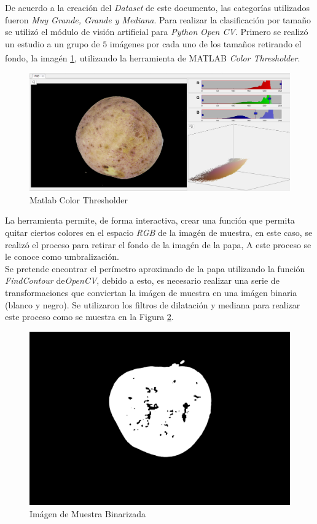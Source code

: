 	De acuerdo a la creación del \textit{Dataset} de este documento, las categorías utilizados fueron \textit{Muy Grande, Grande y Mediana}. Para realizar la clasificación por tamaño se utilizó el módulo de visión artificial para \textit{Python} \textit{Open CV}. Primero se realizó un estudio a un grupo de $5$ imágenes por cada uno de los tamaños retirando el fondo, la imagén \ref{fig:matlabcv}, utilizando la herramienta de MATLAB\textsuperscript{\textregistered} \textit{Color Thresholder}.
	
				
	\begin{figure}[ht]
		\centering
		\includegraphics[scale=0.3]{Figs/matlabcv.png}
		\caption{Matlab Color Thresholder}
		\label{fig:matlabcv}
	\end{figure}
	
	La herramienta permite, de forma interactiva, crear una función que permita quitar ciertos colores en el espacio \textit{RGB} de la imagén de muestra, en este caso, se realizó el proceso para retirar el fondo de la imagén de la papa, A este proceso se le conoce como umbralización. \\
	
	Se pretende encontrar el perímetro aproximado de la papa utilizando la función \textit{FindContour} de\textit{OpenCV}, debido a esto, es necesario realizar una serie de transformaciones que conviertan la imágen de muestra en una imágen binaria (blanco y negro). Se utilizaron los filtros de dilatación y mediana para realizar este proceso como se muestra en la Figura \ref{fig:dilmed}.	
					
	\begin{figure}[ht]
		\centering
		\includegraphics[scale=0.05]{Figs/dilmed.png}
		\caption{Imágen de Muestra Binarizada}
		\label{fig:dilmed}
	\end{figure}

